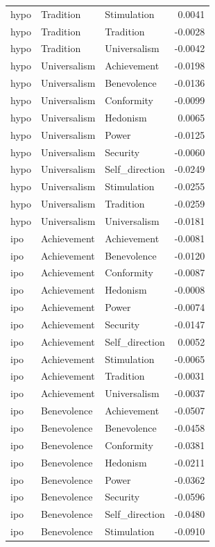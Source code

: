 \begin{tabular}{lllr}
hypo & Tradition & Stimulation & 0.0041 \\
hypo & Tradition & Tradition & -0.0028 \\
hypo & Tradition & Universalism & -0.0042 \\
hypo & Universalism & Achievement & -0.0198 \\
hypo & Universalism & Benevolence & -0.0136 \\
hypo & Universalism & Conformity & -0.0099 \\
hypo & Universalism & Hedonism & 0.0065 \\
hypo & Universalism & Power & -0.0125 \\
hypo & Universalism & Security & -0.0060 \\
hypo & Universalism & Self\_direction & -0.0249 \\
hypo & Universalism & Stimulation & -0.0255 \\
hypo & Universalism & Tradition & -0.0259 \\
hypo & Universalism & Universalism & -0.0181 \\
ipo & Achievement & Achievement & -0.0081 \\
ipo & Achievement & Benevolence & -0.0120 \\
ipo & Achievement & Conformity & -0.0087 \\
ipo & Achievement & Hedonism & -0.0008 \\
ipo & Achievement & Power & -0.0074 \\
ipo & Achievement & Security & -0.0147 \\
ipo & Achievement & Self\_direction & 0.0052 \\
ipo & Achievement & Stimulation & -0.0065 \\
ipo & Achievement & Tradition & -0.0031 \\
ipo & Achievement & Universalism & -0.0037 \\
ipo & Benevolence & Achievement & -0.0507 \\
ipo & Benevolence & Benevolence & -0.0458 \\
ipo & Benevolence & Conformity & -0.0381 \\
ipo & Benevolence & Hedonism & -0.0211 \\
ipo & Benevolence & Power & -0.0362 \\
ipo & Benevolence & Security & -0.0596 \\
ipo & Benevolence & Self\_direction & -0.0480 \\
ipo & Benevolence & Stimulation & -0.0910 \\

\end{tabular}
